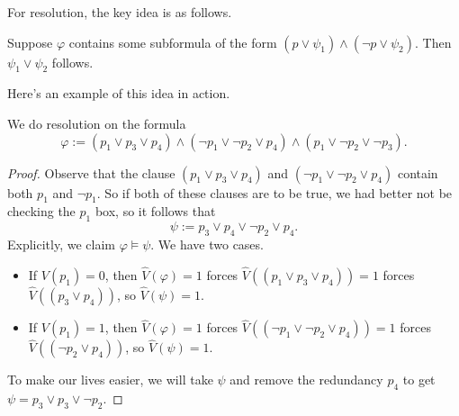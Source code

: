 \documentclass[../notes.tex]{subfiles}
\begin{document}
For resolution, the key idea is as follows.
\begin{idea}
	Suppose $\varphi$ contains some subformula of the form $(p\lor\psi_1)\land(\lnot p\lor\psi_2)$. Then $\psi_1\lor\psi_2$ follows.
\end{idea}
Here's an example of this idea in action.
\begin{exe} \label{exe:resolutionex}
	We do resolution on the formula
	\[\varphi:=(p_1\lor p_3\lor p_4)\land(\lnot p_1\lor\lnot p_2\lor p_4)\land(p_1\lor\lnot p_2\lor\lnot p_3).\]
\end{exe}
\begin{proof}
	Observe that the clause $(p_1\lor p_3\lor p_4)$ and $(\lnot p_1\lor\lnot p_2\lor p_4)$ contain both $p_1$ and $\lnot p_1$. So if both of these clauses are to be true, we had better not be checking the $p_1$ box, so it follows that
	\[\psi:=p_3\lor p_4\lor\lnot p_2\lor p_4.\]
	Explicitly, we claim $\varphi\models\psi$. We have two cases.
	\begin{itemize}
		\item If $V(p_1)=0$, then $\hat V(\varphi)=1$ forces $\hat V((p_1\lor p_3\lor p_4))=1$ forces $\hat V((p_3\lor p_4))$, so $\hat V(\psi)=1$.
		\item If $V(p_1)=1$, then $\hat V(\varphi)=1$ forces $\hat V((\lnot p_1\lor\lnot p_2\lor p_4))=1$ forces $\hat V((\lnot p_2\lor p_4))$, so $\hat V(\psi)=1$.
	\end{itemize}
	To make our lives easier, we will take $\psi$ and remove the redundancy $p_4$ to get $\psi=p_3\lor p_3\lor\lnot p_2$.


\end{proof}
\end{document}
